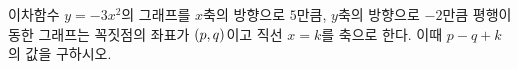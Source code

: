 이차함수 $y=-3x^2$의 그래프를 $x$축의 방향으로 $5$만큼, $y$축의 방향으로 $-2$만큼 평행이동한 그래프는 꼭짓점의 좌표가 $(p{,}\mkern3mu q)$이고 직선 $x=k$를 축으로 한다. 이때 $p-q+k$의 값을 구하시오.
